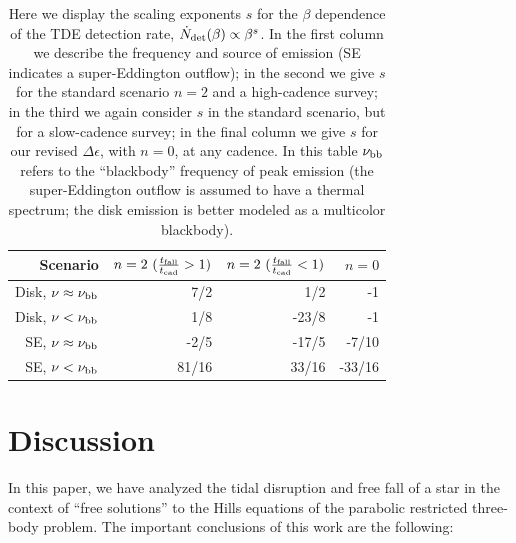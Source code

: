 \documentclass[useAMS, twocolumn, usenatbib]{mn2e}
\begin{document}
\begin{table}
\centering
\begin{tabular}{ r || r | r | r }
  Scenario & $n=2~(\frac{t_{\rm fall}}{t_{\rm cad}}>1)$ & $n=2~(\frac{t_{\rm fall}}{t_{\rm cad}}<1)$ & $n=0$  \\
  \hline                        
  Disk, $\nu\approx \nu_{\rm bb}$ & 7/2 & 1/2 & -1  \\
  Disk, $\nu< \nu_{\rm bb}$ & 1/8 & -23/8 & -1  \\
  SE, $\nu\approx \nu_{\rm bb}$ & -2/5 & -17/5 & -7/10  \\
  SE, $\nu< \nu_{\rm bb}$ & 81/16 & 33/16 & -33/16  \\
          \end{tabular}
\label{PNValidation}
\caption{Here we display the scaling exponents $s$ for the $\beta$ dependence of the TDE detection rate, $\dot{N}_{\rm det}(\beta) \propto \beta^{s}$.  In the first column we describe the frequency and source of emission (SE indicates a super-Eddington outflow); in the second we give $s$ for the standard scenario $n=2$ and a high-cadence survey; in the third we again consider $s$ in the standard scenario, but for a slow-cadence survey; in the final column we give $s$ for our revised $\Delta\epsilon$, with $n=0$, at any cadence.  In this table $\nu_{\rm bb}$ refers to the ``blackbody'' frequency of peak emission (the super-Eddington outflow is assumed to have a thermal spectrum; the disk emission is better modeled as a multicolor blackbody).}
\end{table}



\section{Discussion}
In this paper, we have analyzed the tidal disruption and free fall of a star in the context of ``free solutions'' to the Hills equations of the parabolic restricted three-body problem.  The important conclusions of this work are the following:
\end{document}

